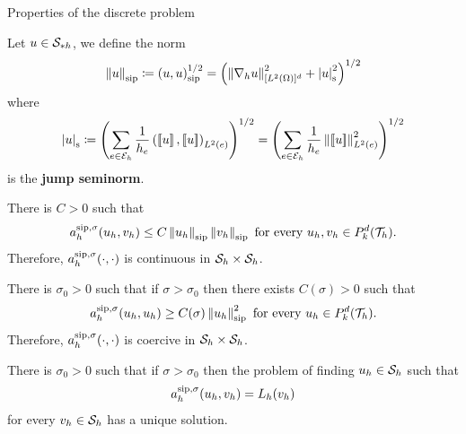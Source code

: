 \begin{frame}[allowframebreaks]{Properties of the discrete problem}

\begin{definicion}
	Let $u\in\S_{*h}$, we define the norm
	\begin{equation*}
	\norma{u}_{\text{sip}}\coloneqq\escalarsip{u}{u}^{1/2}=\left(\norma{\nabla_h u}^2_{[L^2(\Omega)]^d}+\left|u\right|^2_{\text{s}}\right)^{1/2}
	\end{equation*}
	where
	\begin{equation*}
	\left|u\right|_{\text{s}}\coloneqq \left(\sum_{e\in\E_h}\frac{1}{h_e}\escalar{\salto{u}}{\salto{u}}_{L^2(e)}\right)^{1/2}=\left(\sum_{e\in\E_h}\frac{1}{h_e}\norma{\salto{u}}^2_{L^2(e)}\right)^{1/2}
	\end{equation*}
	is the \textbf{jump seminorm}.
\end{definicion}
\framebreak
{\small
\begin{lemma}
	There is $C>0$ such that $$\asip{u_h}{v_h}\leq C\norma{u_h}_{\text{sip}}\normasip{v_h}\text{ for every }u_h,v_h\in\mathbb{P}_k^d(\T_h).$$ Therefore, $\asip{\cdot}{\cdot}$ is continuous in $\S_h\times\S_h$.
\end{lemma}

\begin{lemma}
	\label{lemma:eliptico_coercitividad}
	There is $\sigma_0>0$ such that if $\sigma>\sigma_0$ then there exists $C(\sigma)>0$ such that $$\asip{u_h}{u_h}\geq C(\sigma)\norma{u_h}_{\text{sip}}^2\text{ for every }u_h\in\mathbb{P}_k^d(\T_h).$$ Therefore, $\asip{\cdot}{\cdot}$ is coercive in $\S_h\times\S_h$.
\end{lemma}
}
\framebreak
\begin{lemma}
	\label{lemma:buen_planteamiento_form_var_DG_elpitica}
	There is $\sigma_0>0$ such that if $\sigma>\sigma_0$ then the problem of finding $u_h\in\S_h$ such that $$\asip{u_h}{v_h}=L_h(v_h)$$ for every $v_h\in\S_h$ has a unique solution.
\end{lemma}

\end{frame}

